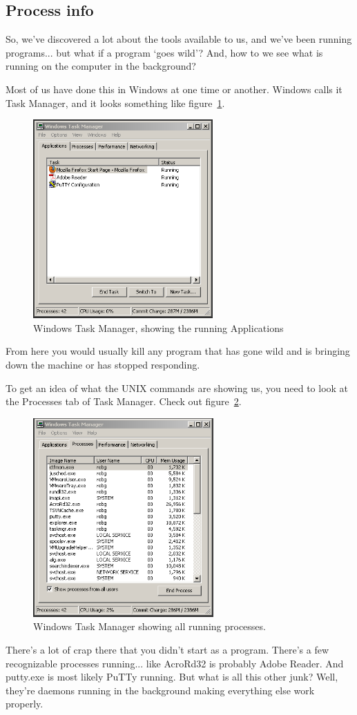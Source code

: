 \subsection {Process info}

So, we've discovered a lot about the tools available to us, and 
we've been running programs... but what if a program `goes wild'? And, 
how to we see what is running on the computer in the background?

Most of us have done this in Windows at one time or another. Windows
calls it Task Manager, and it looks something like figure~\ref{fig:Explorer-Applications}.
\begin{figure}[htbp]
	\centering
		\includegraphics[height=3in]{shell/Explorer-Applications.png}
	\caption{Windows Task Manager, showing the running Applications}
	\label{fig:Explorer-Applications}
\end{figure}
From here you would usually kill any program that has gone wild
and is bringing down the machine or has stopped responding.

To get an idea of what the UNIX commands are showing us, you need
to look at the Processes tab of  Task Manager. Check out figure~\ref{fig:Explorer-Processes}.
\begin{figure}[htbp]
	\centering
		\includegraphics[height=3in]{shell/Explorer-Processes.png}
	\caption{Windows Task Manager showing all running processes.}
	\label{fig:Explorer-Processes}
\end{figure}
There's a lot of crap there that you didn't start as a program. There's a few
recognizable processes running... like AcroRd32 is probably Adobe Reader. And putty.exe
is most likely PuTTy running. But what is all this other junk? Well, they're daemons running in the
background making everything else work properly. 

